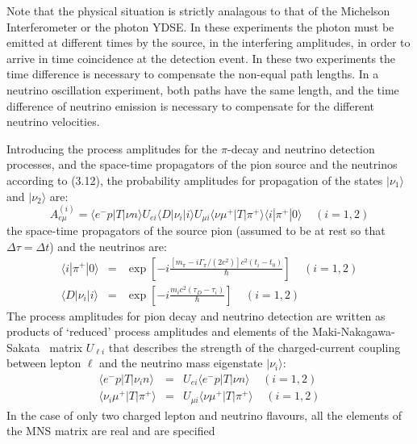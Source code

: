 {    \par  Note that the physical situation is
    strictly analagous to that of the Michelson Interferometer or the photon YDSE.
   In these experiments the photon must be emitted at different times by the source, in
  the interfering amplitudes, in order to arrive in time coincidence at the
   detection event. In these two experiments the time difference is necessary to 
   compensate the non-equal path lengths. In a neutrino oscillation experiment,
   both paths have the same length, and the time difference of neutrino emission
   is necessary to compensate for the different neutrino velocities. 
   \par Introducing the process amplitudes for the $\pi$-decay and neutrino detection
   processes, and the space-time propagators of the pion source and the neutrinos
   according to (3.12), the probability amplitudes for propagation of the states
   $|\nu_1\rangle$ and $|\nu_2\rangle$ are: 
   \begin{equation}
    A_{e \mu}^{(i)} = \langle e^- p |T|\nu n \rangle U_{e i} \langle D |\nu_i| i \rangle U_{\mu i}
 \langle \nu \mu^+ |T|\pi^+ \rangle \langle i |\pi^+| 0 \rangle~~~~~(i = 1,2)
  \end{equation}
  the space-time propagators of the source pion (assumed to be at rest so that $\Delta \tau = \Delta t$)
   and the neutrinos are:
  \begin{eqnarray}
   \langle i |\pi^+| 0 \rangle & = & \exp \left[-i\frac{[m_{\pi}-i\Gamma_{\pi}/(2 c^2)] c^2(t_i-t_0)}
     {\hbar} \right]~~~~~(i = 1,2) \\
   \langle D |\nu_i| i \rangle & = & \exp \left[-i\frac{m_i c^2 (\tau_D-\tau_i)}  {\hbar} \right]~~~~~(i = 1,2) 
   \end{eqnarray}
 The process amplitudes for pion decay and neutrino detection are written as products of `reduced' process
  amplitudes and elements of the Maki-Nakagawa-Sakata~\cite{MNS} matrix $U_{\ell i}$ that describes the strength
 of the charged-current coupling between lepton $\ell$ and the neutrino mass eigenstate $|\nu_i\rangle$:
   \begin{eqnarray}
  \langle e^- p |T|\nu_i n \rangle & = &  U_{e i} \langle e^-  p |T|\nu n \rangle~~~~~(i = 1,2) \\
   \langle \nu_i \mu^+ |T|\pi^+ \rangle  & = & U_{\mu i} \langle \nu \mu^+ |T|\pi^+ \rangle~~~~~(i = 1,2)
   \end{eqnarray}
  In the case of only two charged lepton and neutrino flavours,
    all the elements of the MNS matrix are real and are specified
}
